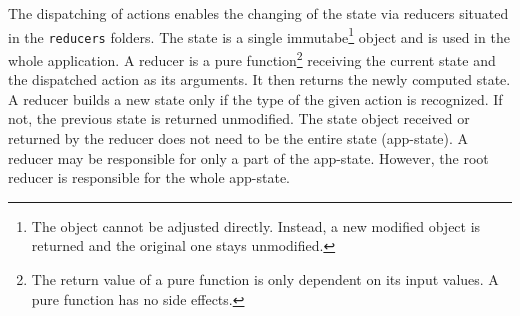 The dispatching of actions enables the changing of the state via reducers situated in the \texttt{reducers} folders. The state is a single immutabe\footnote{The object cannot be adjusted directly. Instead, a new modified object is returned and the original one stays unmodified.} object and is used in the whole application. A \hypertarget{reducers}{reducer} is a pure function\footnote{The return value of a pure function is only dependent on its input values. A pure function has no side effects.} receiving the current state and the dispatched action as its arguments. It then returns the newly computed state. A reducer builds a new state only if the type of the given action is recognized. If not, the previous state is returned unmodified. The state object received or returned by the reducer does not need to be the entire state (app-state). A reducer may be responsible for only a part of the app-state. However, the root reducer is responsible for the whole app-state.